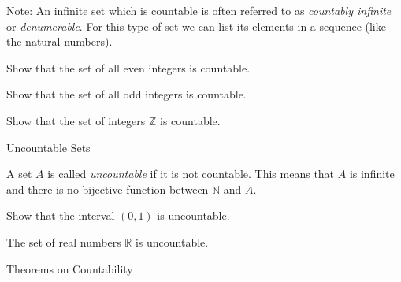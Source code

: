 \documentclass[12pt, a4paper]{article}
\newcommand{\N}{\mathbb{N}}
\newcommand{\R}{\mathbb{R}}
\newcommand{\Z}{\mathbb{Z}}
\begin{document}
\vfill

\vspace{15pt}
\begin{tcolorbox}[colback=ProbBack, colframe=ProbMain]
	Note: An infinite set which is countable is often referred to as \textit{countably infinite} or \textit{denumerable}. For this type of set we can list its elements in a sequence (like the natural numbers).
\end{tcolorbox}

\vfill

\clearpage

\begin{problem}
	Show that the set of all even integers is countable.
\end{problem}

\clearpage

\begin{problem}
	Show that the set of all odd integers is countable.
\end{problem}

\clearpage

\begin{problem}
	Show that the set of integers \(\Z\) is countable.	
\end{problem}

\clearpage

\begin{heading}
	Uncountable Sets
\end{heading}

\vspace{10pt}

\begin{definition}
	A set \(A\) is called \textit{uncountable} if it is not countable. This means that \(A\) is infinite and there is no bijective function between \(\N\) and \(A\).
\end{definition}

\clearpage

\begin{problem}
	Show that the interval \((0, 1)\) is uncountable.	
\end{problem}

\clearpage

\begin{problem}
	The set of real numbers \(\R\) is uncountable.
\end{problem}

\clearpage

\begin{heading}
	Theorems on Countability
\end{heading}
\end{document}
